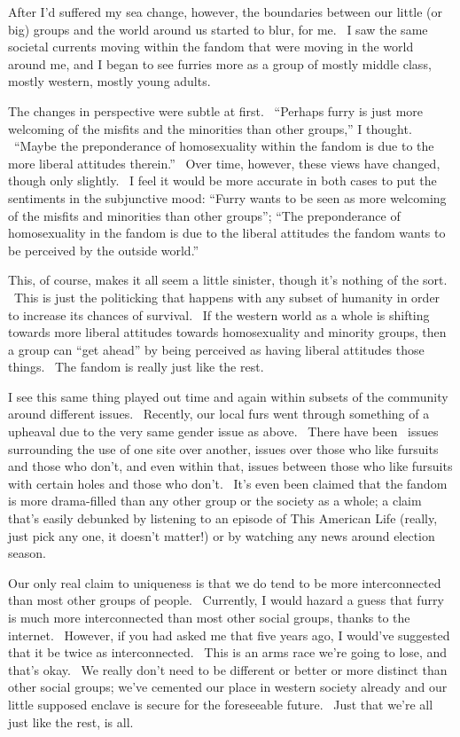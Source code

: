 After I'd suffered my sea change, however, the boundaries between our
little (or big) groups and the world around us started to blur, for me.
~I saw the same societal currents moving within the fandom that were
moving in the world around me, and I began to see furries more as a
group of mostly middle class, mostly western, mostly young adults.

The changes in perspective were subtle at first. ~``Perhaps furry is
just more welcoming of the misfits and the minorities than other
groups,'' I thought. ~``Maybe the preponderance of homosexuality within
the fandom is due to the more liberal attitudes therein.'' ~Over time,
however, these views have changed, though only slightly. ~I feel it
would be more accurate in both cases to put the sentiments in the
subjunctive mood: ``Furry wants to be seen as more welcoming of the
misfits and minorities than other groups''; ``The preponderance of
homosexuality in the fandom is due to the liberal attitudes the fandom
wants to be perceived by the outside world.''

This, of course, makes it all seem a little sinister, though it's
nothing of the sort. ~This is just the politicking that happens with any
subset of humanity in order to increase its chances of survival. ~If the
western world as a whole is shifting towards more liberal attitudes
towards homosexuality and minority groups, then a group can ``get
ahead'' by being perceived as having liberal attitudes those things.
~The fandom is really just like the rest.

I see this same thing played out time and again within subsets of the
community around different issues. ~Recently, our local furs went
through something of a upheaval due to the very same gender issue as
above. ~There have been ~issues surrounding the use of one site over
another, issues over those who like fursuits and those who don't, and
even within that, issues between those who like fursuits with certain
holes and those who don't. ~It's even been claimed that the fandom is
more drama-filled than any other group or the society as a whole; a
claim that's easily debunked by listening to an episode of This American
Life (really, just pick any one, it doesn't matter!) or by watching any
news around election season.

Our only real claim to uniqueness is that we do tend to be more
interconnected than most other groups of people. ~Currently, I would
hazard a guess that furry is much more interconnected than most other
social groups, thanks to the internet. ~However, if you had asked me
that five years ago, I would've suggested that it be twice as
interconnected. ~This is an arms race we're going to lose, and that's
okay. ~We really don't need to be different or better or more distinct
than other social groups; we've cemented our place in western society
already and our little supposed enclave is secure for the foreseeable
future. ~Just that we're all just like the rest, is all.
